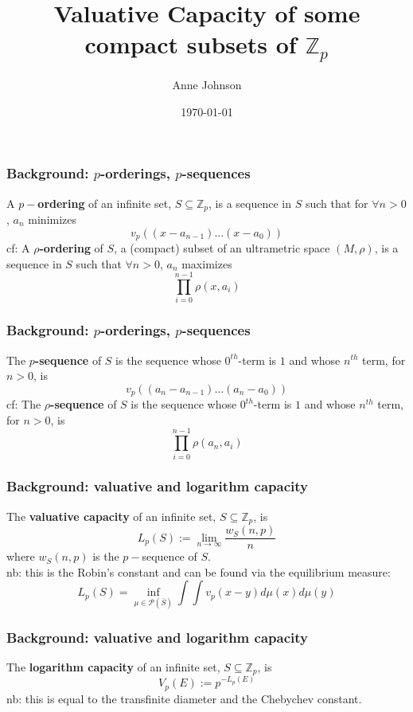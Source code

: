 \documentclass{beamer}
\title{Valuative Capacity of some compact subsets of $\mathbb{Z}_p$}
\author{Anne Johnson}
\date{\today}
\theoremstyle{definition}
\begin{document}
\maketitle

\begin{frame}
\frametitle{Background: $p$-orderings, $p$-sequences}
A \textbf{$p-$ordering} of an infinite set, $S \subseteq \mathbb{Z}_p$, is a sequence in $S$ such that for $\forall n > 0$, $a_n$ minimizes
\[v_p((x - a_{n-1}) \ldots (x - a_0))\] 
\pause \newline
cf: A \textbf{$\rho$-ordering} of $S$, a (compact) subset of an ultrametric space $(M, \rho)$,  is a sequence in $S$ such that $\forall n > 0$, $a_n$ maximizes 
\[\prod_{i=0}^{n-1} \rho(x,a_i)\] 
\end{frame}

\begin{frame}
\frametitle{Background: $p$-orderings, $p$-sequences}

 The \textbf{$p$-sequence} of $S$ is the sequence whose $0^{th}$-term is $1$ and whose $n^{th}$ term, for $n >0$, is 
\[v_p ((a_n-a_{n-1}) \ldots (a_n - a_0))\]
\pause \newline
cf:  The \textbf{$\rho$-sequence} of $S$ is the sequence whose $0^{th}$-term is $1$ and whose $n^{th}$ term, for $n >0$, is
\[\prod_{i=0}^{n-1} \rho(a_n,a_i)\]

\end{frame}


\begin{frame}
\frametitle{Background: valuative and logarithm capacity}
 The \textbf{valuative capacity} of an infinite set, $S \subseteq \mathbb{Z}_p$, is
\[ L_p(S) := \lim_{n\to\infty}  \frac{w_S(n,p)}{n}\]
where $w_S(n,p)$ is the $p-$sequence of $S$. 
\newline
\\nb: this is the Robin's constant and can be found via the equilibrium measure:
 \[L_p(S) = \inf_{\mu\in\mathcal{P}(\bar{S}) } \int \int v_p(x-y)d\mu(x)d\mu(y)\]
\end{frame}

\begin{frame}
\frametitle{Background: valuative and logarithm capacity}
 The \textbf{logarithm capacity} of an infinite set, $S \subseteq \mathbb{Z}_p$, is
\[ V_p(E) := p^{-L_p(E)}\]
\newline
nb: this is equal to the transfinite diameter and the Chebychev constant.
\pause \newline
\end{frame}
\end{document}
